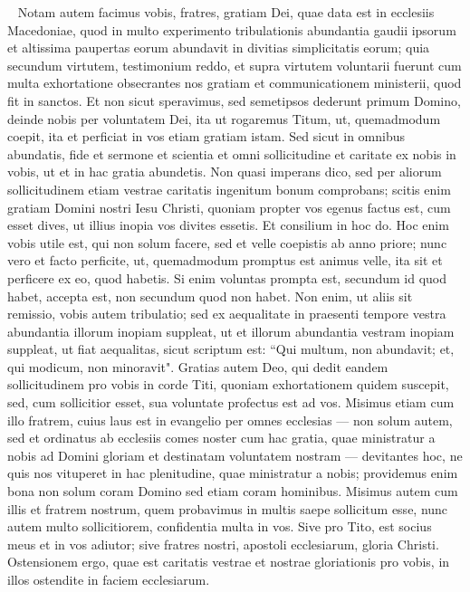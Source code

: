\begin{biblechapter}    
\verse Notam autem facimus vobis, fratres, gratiam Dei, quae data est in ecclesiis Macedoniae, 
\verse quod in multo experimento tribulationis abundantia gaudii ipsorum et altissima paupertas eorum abundavit in divitias simplicitatis eorum; 
\verse quia secundum virtutem, testimonium reddo, et supra virtutem voluntarii fuerunt 
\verse cum multa exhortatione obsecrantes nos gratiam et communicationem ministerii, quod fit in sanctos. 
\verse Et non sicut speravimus, sed semetipsos dederunt primum Domino, deinde nobis per voluntatem Dei, 
\verse ita ut rogaremus Titum, ut, quemadmodum coepit, ita et perficiat in vos etiam gratiam istam. 
\verse Sed sicut in omnibus abundatis, fide et sermone et scientia et omni sollicitudine et caritate ex nobis in vobis, ut et in hac gratia abundetis.  
\verse Non quasi imperans dico, sed per aliorum sollicitudinem etiam vestrae caritatis ingenitum bonum comprobans; 
\verse scitis enim gratiam Domini nostri Iesu Christi, quoniam propter vos egenus factus est, cum esset dives, ut illius inopia vos divites essetis. 
\verse Et consilium in hoc do. Hoc enim vobis utile est, qui non solum facere, sed et velle coepistis ab anno priore; 
\verse nunc vero et facto perficite, ut, quemadmodum promptus est animus velle, ita sit et perficere ex eo, quod habetis. 
\verse Si enim voluntas prompta est, secundum id quod habet, accepta est, non secundum quod non habet. 
\verse Non enim, ut aliis sit remissio, vobis autem tribulatio; sed ex aequalitate 
\verse in praesenti tempore vestra abundantia illorum inopiam suppleat, ut et illorum abundantia vestram inopiam suppleat, ut fiat aequalitas, sicut scriptum est: 
\verse “Qui multum, non abundavit; et, qui modicum, non minoravit". 
\verse Gratias autem Deo, qui dedit eandem sollicitudinem pro vobis in corde Titi, 
\verse quoniam exhortationem quidem suscepit, sed, cum sollicitior esset, sua voluntate profectus est ad vos. 
\verse Misimus etiam cum illo fratrem, cuius laus est in evangelio per omnes ecclesias 
\verse — non solum autem, sed et ordinatus ab ecclesiis comes noster cum hac gratia, quae ministratur a nobis ad Domini gloriam et destinatam voluntatem nostram — 
\verse devitantes hoc, ne quis nos vituperet in hac plenitudine, quae ministratur a nobis; 
\verse providemus enim bona non solum coram Domino sed etiam coram hominibus. 
\verse Misimus autem cum illis et fratrem nostrum, quem probavimus in multis saepe sollicitum esse, nunc autem multo sollicitiorem, confidentia multa in vos. 
\verse Sive pro Tito, est socius meus et in vos adiutor; sive fratres nostri, apostoli ecclesiarum, gloria Christi. 
\verse Ostensionem ergo, quae est caritatis vestrae et nostrae gloriationis pro vobis, in illos ostendite in faciem ecclesiarum. 
\end{biblechapter}

